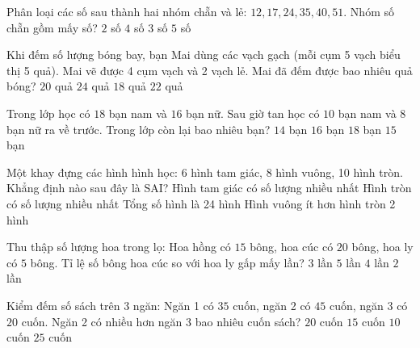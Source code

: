 \begin{ex} %
Phân loại các số sau thành hai nhóm chẵn và lẻ: $12, 17, 24, 35, 40, 51$. Nhóm số chẵn gồm mấy số?
\choice
{$2$ số}
{$4$ số}
{\True $3$ số}
{$5$ số}
\end{ex}

\begin{ex} %
Khi đếm số lượng bóng bay, bạn Mai dùng các vạch gạch (mỗi cụm 5 vạch biểu thị 5 quả). Mai vẽ được 4 cụm vạch và 2 vạch lẻ. Mai đã đếm được bao nhiêu quả bóng?
\choice
{$20$ quả}
{$24$ quả}
{$18$ quả}
{\True $22$ quả}
\end{ex}

\begin{ex} %
Trong lớp học có $18$ bạn nam và $16$ bạn nữ. Sau giờ tan học có $10$ bạn nam và $8$ bạn nữ ra về trước. Trong lớp còn lại bao nhiêu bạn?
\choice
{$14$ bạn}
{\True $16$ bạn}
{$18$ bạn}
{$15$ bạn}
\end{ex}

\begin{ex} %
Một khay đựng các hình hình học: 6 hình tam giác, 8 hình vuông, 10 hình tròn. Khẳng định nào sau đây là SAI?
\choice
{\True Hình tam giác có số lượng nhiều nhất}
{Hình tròn có số lượng nhiều nhất}
{Tổng số hình là 24 hình}
{Hình vuông ít hơn hình tròn 2 hình}
\end{ex}

\begin{ex} %
Thu thập số lượng hoa trong lọ: Hoa hồng có $15$ bông, hoa cúc có $20$ bông, hoa ly có $5$ bông. Tỉ lệ số bông hoa cúc so với hoa ly gấp mấy lần?
\choice
{$3$ lần}
{$5$ lần}
{\True $4$ lần}
{$2$ lần}
\end{ex}

\begin{ex} %
Kiểm đếm số sách trên 3 ngăn: Ngăn 1 có $35$ cuốn, ngăn 2 có $45$ cuốn, ngăn 3 có $20$ cuốn. Ngăn 2 có nhiều hơn ngăn 3 bao nhiêu cuốn sách?
\choice
{$20$ cuốn}
{$15$ cuốn}
{$10$ cuốn}
{\True $25$ cuốn}
\end{ex}

